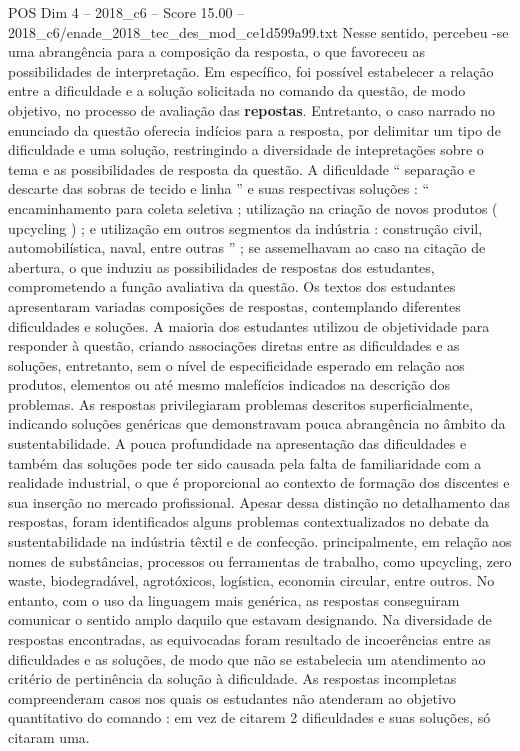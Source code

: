\begin{textsample}{POS Dim 4 – 2018\_c6 – Score 15.00 – 2018\_c6/enade\_2018\_tec\_des\_mod\_ce1d599a99.txt}
Nesse sentido, percebeu -se uma abrangência para a composição da resposta, o que favoreceu as possibilidades de interpretação.
Em específico, foi possível estabelecer a relação entre a dificuldade e a solução solicitada no comando da questão, de modo objetivo, no processo de avaliação das \textbf{repostas}.
Entretanto, o caso narrado no enunciado da questão oferecia indícios para a resposta, por delimitar um tipo de dificuldade e uma solução, restringindo a diversidade de intepretações sobre o tema e as possibilidades de resposta da questão.
A dificuldade “ separação e descarte das sobras de tecido e linha ” e suas respectivas soluções : “ encaminhamento para coleta seletiva ; utilização na criação de novos produtos ( upcycling ) ; e utilização em outros segmentos da indústria : construção civil, automobilística, naval, entre outras ” ; se assemelhavam ao caso na citação de abertura, o que induziu as possibilidades de respostas dos estudantes, comprometendo a função avaliativa da questão.
Os textos dos estudantes apresentaram variadas composições de respostas, contemplando diferentes dificuldades e soluções.
A maioria dos estudantes utilizou de objetividade para responder à questão, criando associações diretas entre as dificuldades e as soluções, entretanto, sem o nível de especificidade esperado em relação aos produtos, elementos ou até mesmo malefícios indicados na descrição dos problemas.
As respostas privilegiaram problemas descritos superficialmente, indicando soluções genéricas que demonstravam pouca abrangência no âmbito da sustentabilidade.
A pouca profundidade na apresentação das dificuldades e também das soluções pode ter sido causada pela falta de familiaridade com a realidade industrial, o que é proporcional ao contexto de formação dos discentes e sua inserção no mercado profissional.
Apesar dessa distinção no detalhamento das respostas, foram identificados alguns problemas contextualizados no debate da sustentabilidade na indústria têxtil e de confecção. principalmente, em relação aos nomes de substâncias, processos ou ferramentas de trabalho, como upcycling, zero waste, biodegradável, agrotóxicos, logística, economia circular, entre outros.
No entanto, com o uso da linguagem mais genérica, as respostas conseguiram comunicar o sentido amplo daquilo que estavam designando.
Na diversidade de respostas encontradas, as equivocadas foram resultado de incoerências entre as dificuldades e as soluções, de modo que não se estabelecia um atendimento ao critério de pertinência da solução à dificuldade.
As respostas incompletas compreenderam casos nos quais os estudantes não atenderam ao objetivo quantitativo do comando : em vez de citarem 2 dificuldades e suas soluções, só citaram uma.

\end{textsample}
